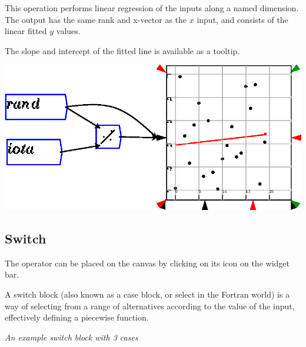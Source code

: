 This operation performs linear regression of the inputs along a named
dimension. The output has the same rank and x-vector as the $x$ input,
and consists of the linear fitted $y$ values.

The slope and intercept of the fitted line is available as a tooltip.

\noindent\includegraphics[width=\textwidth]{images/linearRegression}

\subsection{Switch}

\label{SwitchIcon}


The operator can be placed on the canvas by clicking on its icon on
the widget bar.

A switch block (also known as a case block, or select in the Fortran
world) is a way of selecting from a range of alternatives according
to the value of the input, effectively defining a piecewise function.
\begin{center}
 {\em
An example switch block with 3 cases} 
\par\end{center}

